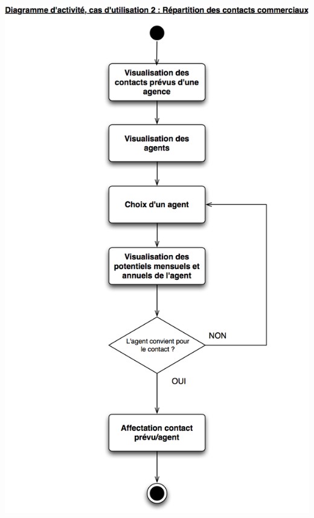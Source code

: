 \begin {center}
\includegraphics[width=\textwidth]{../../diagrammeActivite/DACU2.png}

\end{center}
